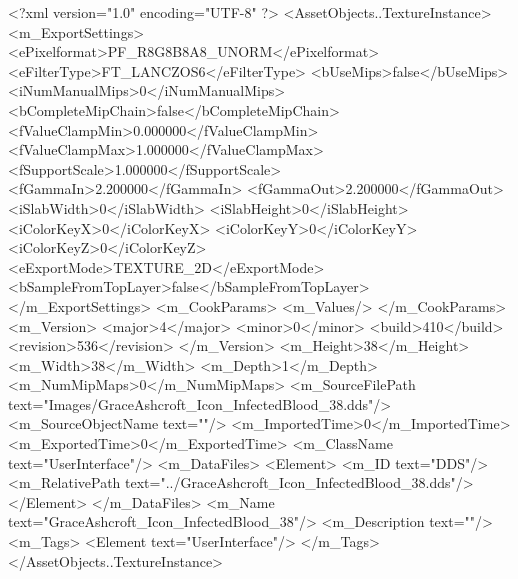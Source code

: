 <?xml version="1.0" encoding="UTF-8" ?>
<AssetObjects..TextureInstance>
	<m_ExportSettings>
		<ePixelformat>PF_R8G8B8A8_UNORM</ePixelformat>
		<eFilterType>FT_LANCZOS6</eFilterType>
		<bUseMips>false</bUseMips>
		<iNumManualMips>0</iNumManualMips>
		<bCompleteMipChain>false</bCompleteMipChain>
		<fValueClampMin>0.000000</fValueClampMin>
		<fValueClampMax>1.000000</fValueClampMax>
		<fSupportScale>1.000000</fSupportScale>
		<fGammaIn>2.200000</fGammaIn>
		<fGammaOut>2.200000</fGammaOut>
		<iSlabWidth>0</iSlabWidth>
		<iSlabHeight>0</iSlabHeight>
		<iColorKeyX>0</iColorKeyX>
		<iColorKeyY>0</iColorKeyY>
		<iColorKeyZ>0</iColorKeyZ>
		<eExportMode>TEXTURE_2D</eExportMode>
		<bSampleFromTopLayer>false</bSampleFromTopLayer>
	</m_ExportSettings>
	<m_CookParams>
		<m_Values/>
	</m_CookParams>
	<m_Version>
		<major>4</major>
		<minor>0</minor>
		<build>410</build>
		<revision>536</revision>
	</m_Version>
	<m_Height>38</m_Height>
	<m_Width>38</m_Width>
	<m_Depth>1</m_Depth>
	<m_NumMipMaps>0</m_NumMipMaps>
	<m_SourceFilePath text="Images/GraceAshcroft_Icon_InfectedBlood_38.dds"/>
	<m_SourceObjectName text=""/>
	<m_ImportedTime>0</m_ImportedTime>
	<m_ExportedTime>0</m_ExportedTime>
	<m_ClassName text="UserInterface"/>
	<m_DataFiles>
		<Element>
			<m_ID text="DDS"/>
			<m_RelativePath text="../GraceAshcroft_Icon_InfectedBlood_38.dds"/>
		</Element>
	</m_DataFiles>
	<m_Name text="GraceAshcroft_Icon_InfectedBlood_38"/>
	<m_Description text=""/>
	<m_Tags>
		<Element text="UserInterface"/>
	</m_Tags>
</AssetObjects..TextureInstance>
